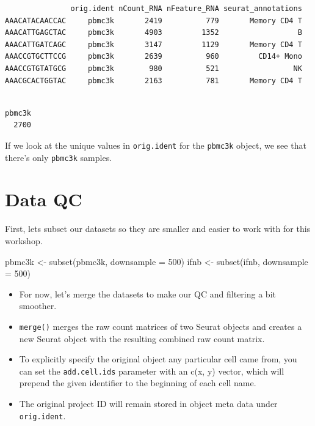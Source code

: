 \documentclass[
  letterpaper,
  DIV=11,
  numbers=noendperiod]{scrreprt}
\newenvironment{Shaded}{\begin{snugshade}}{\end{snugshade}}
\newcommand{\AttributeTok}[1]{\textcolor[rgb]{0.40,0.45,0.13}{#1}}
\newcommand{\DecValTok}[1]{\textcolor[rgb]{0.68,0.00,0.00}{#1}}
\newcommand{\FunctionTok}[1]{\textcolor[rgb]{0.28,0.35,0.67}{#1}}
\newcommand{\NormalTok}[1]{\textcolor[rgb]{0.00,0.23,0.31}{#1}}
\newcommand{\OtherTok}[1]{\textcolor[rgb]{0.00,0.23,0.31}{#1}}
\newcommand{\SpecialCharTok}[1]{\textcolor[rgb]{0.37,0.37,0.37}{#1}}
\providecommand{\tightlist}{%
  \setlength{\itemsep}{0pt}\setlength{\parskip}{0pt}}
\begin{document}
\begin{verbatim}
               orig.ident nCount_RNA nFeature_RNA seurat_annotations
AAACATACAACCAC     pbmc3k       2419          779       Memory CD4 T
AAACATTGAGCTAC     pbmc3k       4903         1352                  B
AAACATTGATCAGC     pbmc3k       3147         1129       Memory CD4 T
AAACCGTGCTTCCG     pbmc3k       2639          960         CD14+ Mono
AAACCGTGTATGCG     pbmc3k        980          521                 NK
AAACGCACTGGTAC     pbmc3k       2163          781       Memory CD4 T
\end{verbatim}

\begin{Shaded}
\end{Shaded}

\begin{verbatim}

pbmc3k 
  2700 
\end{verbatim}

If we look at the unique values in \texttt{orig.ident} for the
\texttt{pbmc3k} object, we see that there's only \texttt{pbmc3k}
samples.

\section{Data QC}\label{data-qc}

First, lets subset our datasets so they are smaller and easier to work
with for this workshop.

\begin{Shaded}
\begin{Highlighting}[]
\NormalTok{pbmc3k }\OtherTok{\textless{}{-}} \FunctionTok{subset}\NormalTok{(pbmc3k, }\AttributeTok{downsample =} \DecValTok{500}\NormalTok{)}
\NormalTok{ifnb }\OtherTok{\textless{}{-}} \FunctionTok{subset}\NormalTok{(ifnb, }\AttributeTok{downsample =} \DecValTok{500}\NormalTok{)}
\end{Highlighting}
\end{Shaded}

\begin{itemize}
\tightlist
\item
  For now, let's merge the datasets to make our QC and filtering a bit
  smoother.
\item
  \texttt{merge()} merges the raw count matrices of two Seurat objects
  and creates a new Seurat object with the resulting combined raw count
  matrix.
\item
  To explicitly specify the original object any particular cell came
  from, you can set the \texttt{add.cell.ids} parameter with an c(x, y)
  vector, which will prepend the given identifier to the beginning of
  each cell name.
\item
  The original project ID will remain stored in object meta data under
  \texttt{orig.ident}.
\end{itemize}
\end{document}
